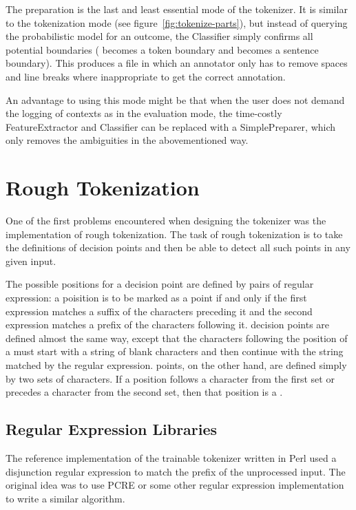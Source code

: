 The preparation is the last and least essential mode of the tokenizer. It is
similar to the tokenization mode (see figure~\ref{fig:tokenize-parts}), but
instead of querying the probabilistic model for an outcome, the Classifier
simply confirms all potential boundaries (\maysplit{} becomes a token boundary
and \maybreaksentence{} becomes a sentence boundary). This produces a file in
which an annotator only has to remove spaces and line breaks where
inappropriate to get the correct annotation.

An advantage to using this mode might be that when the user does not demand the
logging of contexts as in the evaluation mode, the time-costly FeatureExtractor
and Classifier can be replaced with a SimplePreparer, which only removes the
ambiguities in the abovementioned way.

\section{Rough Tokenization}
\label{sec:impl-roughtok}

One of the first problems encountered when designing the tokenizer was
the implementation of rough tokenization. The task of rough tokenization is to
take the definitions of decision points and then be able to detect all such
points in any given input.

The possible positions for a \maysplit{} decision point are defined by pairs
of regular expression: a poisition is to be marked as a \maysplit{} point if
and only if the first expression matches a suffix of the characters preceding
it and the second expression matches a prefix of the characters following it.
\mayjoin{} decision points are defined almost the same way, except that the
characters following the position of a \mayjoin{} must start with a string of
blank characters and then continue with the string matched by the regular
expression. \maybreaksentence{} points, on the other hand, are defined simply
by two sets of characters. If a position follows a character from the first
set or precedes a character from the second set, then that position is a
\maybreaksentence{}.

\subsection{Regular Expression Libraries}
\label{ssec:impl-roughtok-regex}

The reference implementation of the trainable tokenizer written in Perl used a
disjunction regular expression to match the prefix of the unprocessed input.
The original idea was to use PCRE or some other regular expression
implementation to write a similar algorithm.

